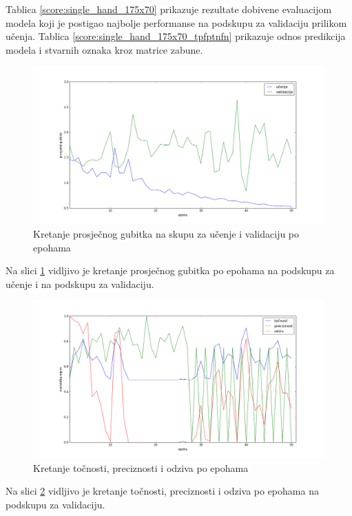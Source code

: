 \documentclass[times, utf8, diplomski, numeric]{fer}
\begin{document}
\noindent Tablica \ref{score:single_hand_175x70} prikazuje rezultate dobivene evaluacijom modela koji je postigao najbolje performanse na podskupu za validaciju prilikom učenja.
Tablica \ref{score:single_hand_175x70_tpfptnfn} prikazuje odnos predikcija modela i stvarnih oznaka kroz matrice zabune.

\begin{figure}[H]
\centering
\includegraphics[scale=0.35]{images/single_hand_scale025_loss.png}
\caption{Kretanje prosječnog gubitka na skupu za učenje i validaciju po epohama}
\label{img:single_hand_scale025_loss}
\end{figure}
\noindent Na slici \ref{img:single_hand_scale025_loss} vidljivo je kretanje prosječnog gubitka po epohama na podskupu za učenje i na podskupu za validaciju.

\begin{figure}[H]
\centering
\includegraphics[scale=0.35]{images/single_hand_scale025_acc_ap.png}
\caption{Kretanje točnosti, preciznosti i odziva po epohama}
\label{img:single_hand_scale025_acc_ap}
\end{figure}
\noindent Na slici \ref{img:single_hand_scale025_acc_ap} vidljivo je kretanje točnosti, preciznosti i odziva po epohama na podskupu za validaciju.
\end{document}

